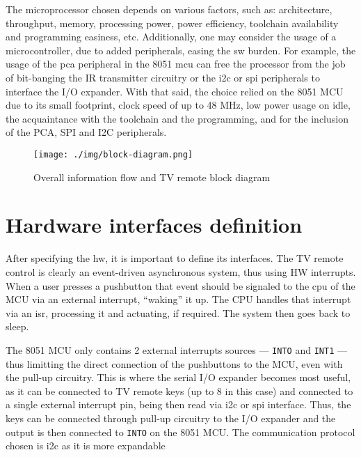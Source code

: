 The microprocessor chosen depends on various factors, such as: architecture,
throughput, memory, processing power, power efficiency, toolchain availability
and programming easiness, etc. Additionally, one may consider the usage of a
microcontroller, due to added peripherals, easing the \gls{sw} burden. For
example, the usage of the \gls{pca} peripheral in the 8051 \gls{mcu} can free the processor from the
job of bit-banging the IR transmitter circuitry or the \gls{i2c} or \gls{spi} peripherals to
interface the I/O expander. With that said, the choice
relied on the 8051 MCU due to its small footprint, clock speed of up to 48 MHz,
low power usage on idle, the acquaintance with the toolchain and the
programming, and for the inclusion of the PCA, SPI and I2C peripherals.  
%
  \vspace{-5mm}
%  
%  
\begin{figure}[htb!]
\centering
    \texttt{[image: ./img/block-diagram.png]}
  \caption{Overall information flow and TV remote block diagram}%
\label{fig:block-diag}
\end{figure}
%
  \vspace{-5mm}
%  
\section{Hardware interfaces definition}
\label{sec:hw-interf-def}
After specifying the \gls{hw}, it is important to define its interfaces. The
TV remote control is clearly an event-driven asynchronous system, thus using HW
interrupts. When a user presses a pushbutton that event should be signaled to
the \gls{cpu} of the MCU via an external interrupt, ``waking'' it up. The CPU
handles that interrupt via an \gls{isr}, processing it and actuating, if
required. The system then goes back to sleep.

The 8051 MCU only contains 2 external interrupts sources --- \texttt{INTO} and
\texttt{INT1} --- thus limitting the direct connection of the pushbuttons to the
MCU, even with the pull-up circuitry. This is where the serial I/O expander
becomes most useful, as it can be connected to TV remote keys (up to 8 in this
case) and connected to a single external interrupt pin, being then read via
\gls{i2c} or \gls{spi} interface. Thus, the keys can be connected through
pull-up circuitry to the I/O expander and the output is then connected to
\texttt{INTO} on the 8051 MCU. The communication protocol chosen is \gls{i2c} as
it is more expandable

